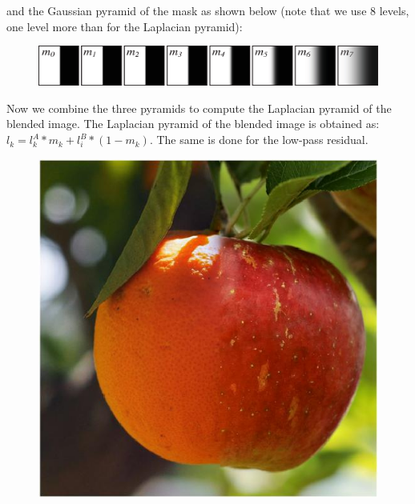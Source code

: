 and the Gaussian pyramid of the mask as shown below (note that we use 8 levels, one level more than for the Laplacian pyramid):
\begin{figure}[h!]
\centerline{
\includegraphics[width=0.9\linewidth]{figures/pyramids/blending_pyrs_mask.eps}
}
\end{figure}

Now we combine the three pyramids to compute the Laplacian pyramid of the blended image. The Laplacian pyramid of the blended image is obtained as: $l_k = l_k^A * m_k + l_i^B * (1-m_k)$. The same is done for the low-pass residual. 

\begin{figure}[h!]
\centerline{
\includegraphics[width=0.45\linewidth]{figures/pyramids/apple_orange_laplacian_8levels.jpg}
}
\label{fig:appleorange}
\end{figure}
%
%


%


